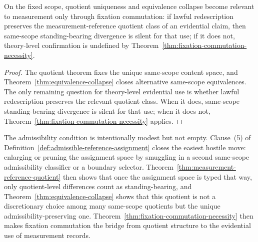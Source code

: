 \begin{corollary}
\label{cor:fixation-central-hinge}
On the fixed scope, quotient uniqueness and equivalence collapse become relevant to measurement only
through fixation commutation: if lawful redescription preserves the measurement-reference quotient
class of an evidential claim, then same-scope standing-bearing divergence is silent for that use; if it
does not, theory-level confirmation is undefined by
Theorem~\ref{thm:fixation-commutation-necessity}.
\end{corollary}

\begin{proof}
The quotient theorem fixes the unique same-scope content space, and
Theorem~\ref{thm:equivalence-collapse} closes alternative same-scope equivalences. The only
remaining question for theory-level evidential use is whether lawful redescription preserves the
relevant quotient class. When it does, same-scope standing-bearing divergence is silent for that use;
when it does not, Theorem~\ref{thm:fixation-commutation-necessity} applies.
\end{proof}

\begin{remark}
The admissibility condition is intentionally modest but not empty. Clause~(5) of
Definition~\ref{def:admissible-reference-assignment} closes the easiest hostile move: enlarging or
pruning the assignment space by smuggling in a second same-scope admissibility classifier or a
boundary selector. Theorem~\ref{thm:measurement-reference-quotient} then shows that once the
assignment space is typed that way, only quotient-level differences count as standing-bearing, and
Theorem~\ref{thm:equivalence-collapse} shows that this quotient is not a discretionary choice among
many same-scope quotients but the unique admissibility-preserving one. Theorem~\ref{thm:fixation-commutation-necessity}
then makes fixation commutation the bridge from quotient structure to the evidential use of
measurement records.
\end{remark}
